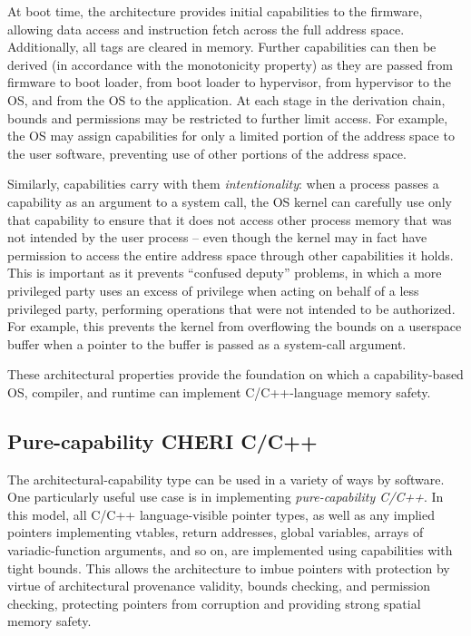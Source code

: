 \documentclass[11pt]{article}
\newcommand{\note}[2]{{\color{blue}[ Note: #1 - #2]}}
\renewcommand{\note}[2]{}
\newcommand{\rwnote}[1]{\note{#1}{Robert W.}}
\newcommand{\pgnnote}[1]{\note{#1}{Peter N.}}
\begin{document}
At boot time, the architecture provides initial capabilities to the firmware,
allowing data access and instruction fetch across the full address space.
Additionally, all tags are cleared in memory.
Further capabilities can then be derived (in accordance with the monotonicity
property) as they are passed from firmware to boot loader, from boot loader to
hypervisor, from hypervisor to the OS, and from the OS to the application.
At each stage in the derivation chain, bounds and permissions may be
restricted to further limit access.
For example, the OS may assign capabilities for only a limited portion of the
address space to the user software, preventing use of other portions of the
address space.



Similarly, capabilities carry with them \textit{intentionality}: when a
process passes a capability as an argument to a system call, the OS kernel can
carefully use only that capability to ensure that it does not access other
process memory that was not intended by the user process -- even though the
kernel may in fact have permission to access the entire address space through
other capabilities it holds.
This is important as it prevents ``confused deputy'' problems, in which a more
privileged party uses an excess of privilege when acting on behalf of a less
privileged party, performing operations that were not intended to be
authorized.
For example, this prevents the kernel from overflowing the bounds on a
userspace buffer when a pointer to the buffer is passed as a
system-call argument.

These architectural properties provide the foundation on which a
capability-based OS, compiler, and runtime can implement C/C++-language memory
safety.

\subsection{Pure-capability CHERI C/C++}

The architectural-capability type can be used in a variety of ways by
software.
One particularly useful use case is in implementing \textit{pure-capability
C/C++}.
In this model, all C/C++ language-visible pointer types, as well as any
implied pointers implementing vtables, return addresses, global variables,
arrays of variadic-function arguments, and so on, are implemented using
capabilities with tight bounds.
This allows the architecture to imbue pointers with protection by virtue of
architectural provenance validity, bounds checking, and permission checking,
protecting pointers from corruption and providing strong spatial memory
safety.
\end{document}
